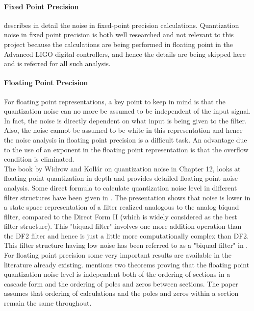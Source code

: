 \documentclass[colorlinks=true,pdfstartview=FitV,linkcolor=blue,
            citecolor=red,urlcolor=magenta]{ligodoc}
\begin{document}
\paragraph{Fixed Point Precision}
	\cite{Oppenheim} describes in detail the noise in fixed-point precision calculations. Quantization noise in fixed point precision is both well researched and not relevant to this project because the calculations are being performed in floating point in the Advanced LIGO digital controllers, and hence the details are being skipped here and \cite{Oppenheim} is referred for all such analysis.
	\paragraph{Floating Point Precision}
For floating point representations, a key point to keep in mind is that the quantization noise can no more be assumed to be independent of the input signal. In fact, the noise is directly dependent on what input is being given to the filter. Also, the noise cannot be assumed to be white in this representation and hence the noise analysis in floating point precision is a difficult task. An advantage due to the use of an exponent in the floating point representation is that the overflow condition is eliminated.\\
The book by Widrow and Koll\'ar on quantization noise in Chapter 12, \cite{Kollar} looks at floating point quantization in depth and provides detailed floating-point noise analysis. Some direct formula to calculate quantization noise level in different filter structures have been given in \cite{Matts}. The presentation \cite{Matts} shows that noise is lower in a state space representation of a filter realized analogous to the analog biquad filter, compared to the Direct Form II  (which is widely considered as the best filter structure). This "biquad filter" involves one more addition operation than the DF2 filter and hence is just a little more computationally complex than DF2. This filter structure having low noise has been referred to as a "biquad filter" in \cite{Matts}.
For floating point precision some very important results are available in the literature already existing. \cite{Zeng} mentions two theorems proving that the floating point quantization noise level is independent both of the ordering of sections in a cascade form and the ordering of poles and zeros between sections. The paper assumes that ordering of calculations and the poles and zeros within a section remain the same throughout.
\\
 
\end{document}
